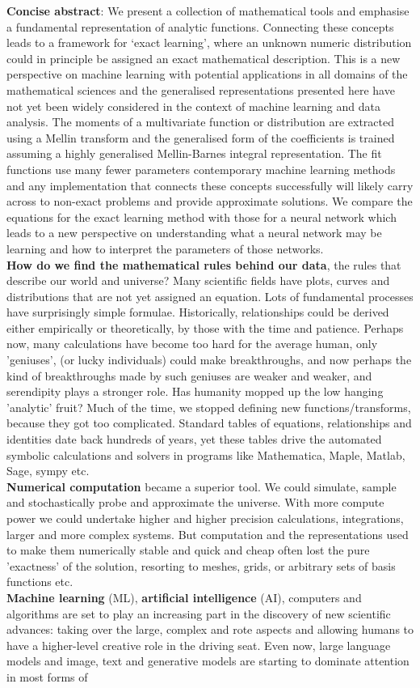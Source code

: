 \documentclass{article}
\begin{document}
\textbf{Concise abstract}: We present a collection of mathematical tools and emphasise a fundamental representation of analytic functions. Connecting these concepts leads to a framework for `exact learning', where an unknown numeric distribution could in principle be assigned an exact mathematical description. This is a new perspective on machine learning with potential applications in all domains of the mathematical sciences and the generalised representations presented here have not yet been widely considered in the context of machine learning and data analysis. The moments of a multivariate function or distribution are extracted using a Mellin transform and the generalised form of the coefficients is trained assuming a highly generalised Mellin-Barnes integral representation. The fit functions use many fewer parameters contemporary machine learning methods and any implementation that connects these concepts successfully will likely carry across to non-exact problems and provide approximate solutions. We compare the equations for the exact learning method with those for a neural network which leads to a new perspective on understanding what a neural network may be learning and how to interpret the parameters of those networks.\\\textbf{How do we find the mathematical rules behind our data}, the rules that describe our world and universe? Many scientific fields have plots, curves and distributions that are not yet assigned an equation. Lots of fundamental processes have surprisingly simple formulae. Historically, relationships could be derived either empirically or theoretically, by those with the time and patience. Perhaps now, many calculations have become too hard for the average human, only 'geniuses', (or lucky individuals) could make breakthroughs, and now perhaps the kind of breakthroughs made by such geniuses are weaker and weaker, and serendipity plays a stronger role. Has humanity mopped up the low hanging 'analytic' fruit? Much of the time, we stopped defining new functions/transforms, because they got too complicated. Standard tables of equations, relationships and identities date back hundreds of years, yet these tables drive the automated symbolic calculations and solvers in programs like Mathematica, Maple, Matlab, Sage, sympy etc.  \\ \textbf{Numerical computation} became a superior tool. We could simulate, sample and stochastically probe and approximate the universe. With more compute power we could undertake higher and higher precision calculations, integrations, larger and more complex systems. But computation and the representations used to make them numerically stable and quick and cheap often lost the pure 'exactness' of the solution, resorting to meshes, grids, or arbitrary sets of basis functions etc. \\ \textbf{Machine learning} (ML), \textbf{artificial intelligence} (AI), computers and algorithms are set to play an increasing part in the discovery of new scientific advances: taking over the large, complex and rote aspects and allowing humans to have a higher-level creative role in the driving seat. Even now, large language models and image, text and generative models are starting to dominate attention in most forms of 
\end{document}
